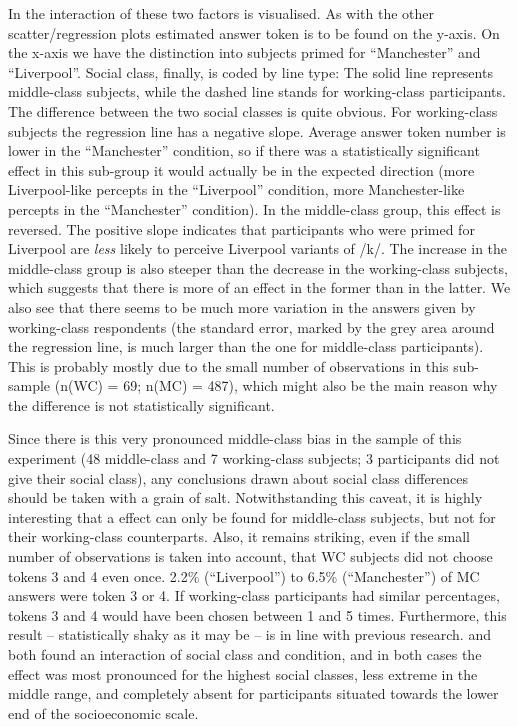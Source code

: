 In  the interaction of these two factors is visualised.
As with the other scatter/regression plots estimated answer token is to be found on the y-axis.
On the x-axis we have the distinction into subjects primed for ``Manchester'' and ``Liverpool''.
Social class, finally, is coded by line type: The solid line represents middle-class subjects, while the dashed line stands for working-class participants.
The difference between the two social classes is quite obvious.
For working-class subjects the regression line has a negative slope.
Average answer token number is lower in the ``Manchester'' condition, so if there was a statistically significant  effect in this sub-group it would actually be in the expected direction (more Liverpool-like percepts in the ``Liverpool'' condition, more Manchester-like percepts in the ``Manchester'' condition).
In the middle-class group, this effect is reversed.
The positive slope indicates that participants who were primed for Liverpool are \emph{less} likely to perceive Liverpool variants of /k/.
The increase in the middle-class group is also steeper than the decrease in the working-class subjects, which suggests that there is more of an effect in the former than in the latter.
We also see that there seems to be much more variation in the answers given by working-class respondents (the standard error, marked by the grey area around the regression line, is much larger than the one for middle-class participants).
This is probably mostly due to the small number of observations in this sub-sample (n(WC) = 69; n(MC) = 487), which might also be the main reason why the difference is not statistically significant.

Since there is this very pronounced middle-class bias in the sample of this experiment (48 middle-class and 7 working-class subjects; 3 participants did not give their social class), any conclusions drawn about social class differences should be taken with a grain of salt.
Notwithstanding this caveat, it is highly interesting that a  effect can only be found for middle-class subjects, but not for their working-class counterparts.
Also, it remains striking, even if the small number of observations is taken into account, that WC subjects did not choose tokens 3 and 4 even once.
2.2\% (``Liverpool'') to 6.5\% (``Manchester'') of MC answers were token 3 or 4.
If working-class participants had similar percentages, tokens 3 and 4 would have been chosen between 1 and 5 times.
Furthermore, this result -- statistically shaky as it may be -- is in line with previous research.
\textcite{hayetal2006a} and \textcite{haydrager2010} both found an interaction of social class and condition, and in both cases the  effect was most pronounced for the highest social classes, less extreme in the middle range, and completely absent for participants situated towards the lower end of the socioeconomic scale.

